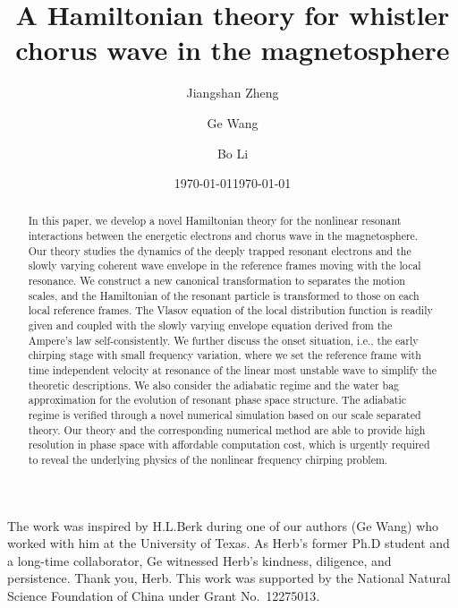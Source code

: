 \documentclass[showkeys,preprint]{revtex4-2}
\begin{document}
\title{A Hamiltonian theory for whistler chorus wave in the magnetosphere}
\author{Jiangshan Zheng}
\author{Ge Wang}
\author{Bo Li}
\date{\today}
\date{\today}
\begin{abstract}
In this paper, we develop a novel Hamiltonian theory for the nonlinear resonant interactions between the energetic electrons and chorus wave in the magnetosphere.
Our theory studies the dynamics of the deeply trapped resonant electrons and the slowly varying coherent wave envelope in the reference frames moving with the local resonance.
We construct a new canonical transformation to separates the motion scales, and the Hamiltonian of the resonant particle is transformed to those on each local reference frames.
The Vlasov equation of the local distribution function is readily given and coupled with the slowly varying envelope equation derived from the Ampere's law self-consistently.
We further discuss the onset situation, i.e., the early chirping stage with small frequency variation, where we set the reference frame with time independent velocity at resonance of the linear most unstable wave to simplify the theoretic descriptions. 
We also consider the adiabatic regime and the water bag approximation for the evolution of resonant phase space structure.
The adiabatic regime is verified through a novel numerical simulation based on our scale separated theory.
Our theory and the corresponding numerical method are able to provide high resolution in phase space with affordable computation cost, which is urgently required to reveal the underlying physics of the nonlinear frequency chirping problem.
\end{abstract}
\maketitle









\begin{acknowledgments}
    The work was inspired by H.L.Berk during one of our authors (Ge Wang) who worked with him at the University of Texas.
    As Herb's former Ph.D student and a long-time collaborator, Ge witnessed Herb's kindness, diligence, and persistence.
    Thank you, Herb.
    This work was supported by the National Natural Science Foundation of China under Grant No.~12275013.
\end{acknowledgments}

%

\end{document}
